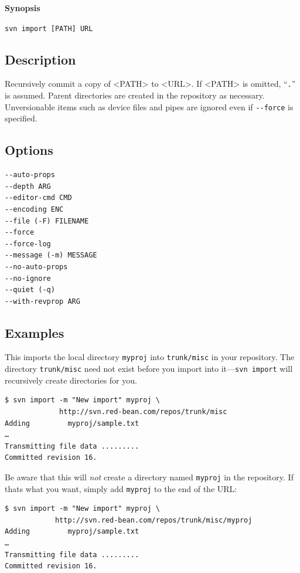 \textbf{Synopsis}

\texttt{svn\ import\ {[}PATH{]}\ URL}

\subsection{Description}

Recursively commit a copy of \textless PATH\textgreater{} to
\textless URL\textgreater. If \textless PATH\textgreater{} is omitted,
``\texttt{.}'' is assumed. Parent directories are created in the
repository as necessary. Unversionable items such as device files and
pipes are ignored even if \texttt{-\/-force} is specified.

\subsection{Options}

\begin{verbatim}
--auto-props
--depth ARG
--editor-cmd CMD
--encoding ENC
--file (-F) FILENAME
--force
--force-log
--message (-m) MESSAGE
--no-auto-props
--no-ignore
--quiet (-q)
--with-revprop ARG
\end{verbatim}

\subsection{Examples}

This imports the local directory \texttt{myproj} into
\texttt{trunk/misc} in your repository. The directory
\texttt{trunk/misc} need not exist before you import into
it---\texttt{svn\ import} will recursively create directories for you.

\begin{verbatim}
$ svn import -m "New import" myproj \
             http://svn.red-bean.com/repos/trunk/misc
Adding         myproj/sample.txt
…
Transmitting file data .........
Committed revision 16.
\end{verbatim}

Be aware that this will \emph{not} create a directory named
\texttt{myproj} in the repository. If that\textquotesingle s what you
want, simply add \texttt{myproj} to the end of the URL:

\begin{verbatim}
$ svn import -m "New import" myproj \
            http://svn.red-bean.com/repos/trunk/misc/myproj
Adding         myproj/sample.txt
…
Transmitting file data .........
Committed revision 16.
\end{verbatim}

